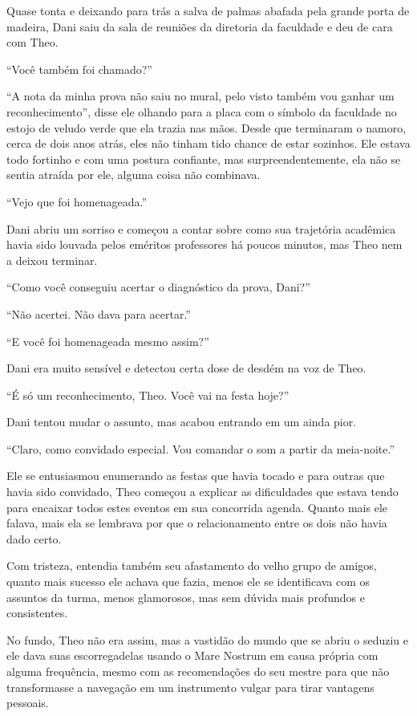 Quase tonta e deixando para trás a salva de palmas abafada pela grande
porta de madeira, Dani saiu da sala de reuniões da diretoria da
faculdade e deu de cara com Theo.

``Você também foi chamado?''

``A nota da minha prova não saiu no mural, pelo visto também vou ganhar
um reconhecimento'', disse ele olhando para a placa com o símbolo da
faculdade no estojo de veludo verde que ela trazia nas mãos. Desde que
terminaram o namoro, cerca de dois anos atrás, eles não tinham tido
chance de estar sozinhos. Ele estava todo fortinho e com uma postura
confiante, mas surpreendentemente, ela não se sentia atraída por ele,
alguma coisa não combinava.

``Vejo que foi homenageada.''

Dani abriu um sorriso e começou a contar sobre como sua trajetória
acadêmica havia sido louvada pelos eméritos professores há poucos
minutos, mas Theo nem a deixou terminar.

``Como você conseguiu acertar o diagnóstico da prova, Dani?''

``Não acertei. Não dava para acertar.''

``E você foi homenageada mesmo assim?''

Dani era muito sensível e detectou certa dose de desdém na voz de Theo.

``É só um reconhecimento, Theo. Você vai na festa hoje?''

Dani tentou mudar o assunto, mas acabou entrando em um ainda pior.

``Claro, como convidado especial. Vou comandar o som a partir da
meia-noite.''

Ele se entusiasmou enumerando as festas que havia tocado e para outras
que havia sido convidado, Theo começou a explicar as dificuldades que
estava tendo para encaixar todos estes eventos em sua concorrida agenda.
Quanto mais ele falava, mais ela se lembrava por que o relacionamento
entre os dois não havia dado certo.

Com tristeza, entendia também seu afastamento do velho grupo de amigos,
quanto mais sucesso ele achava que fazia, menos ele se identificava com
os assuntos da turma, menos glamorosos, mas sem dúvida mais profundos e
consistentes.

No fundo, Theo não era assim, mas a vastidão do mundo que se abriu o
seduziu e ele dava suas escorregadelas usando o Mare Nostrum em causa
própria com alguma frequência, mesmo com as recomendações do seu mestre
para que não transformasse a navegação em um instrumento vulgar para
tirar vantagens pessoais.

